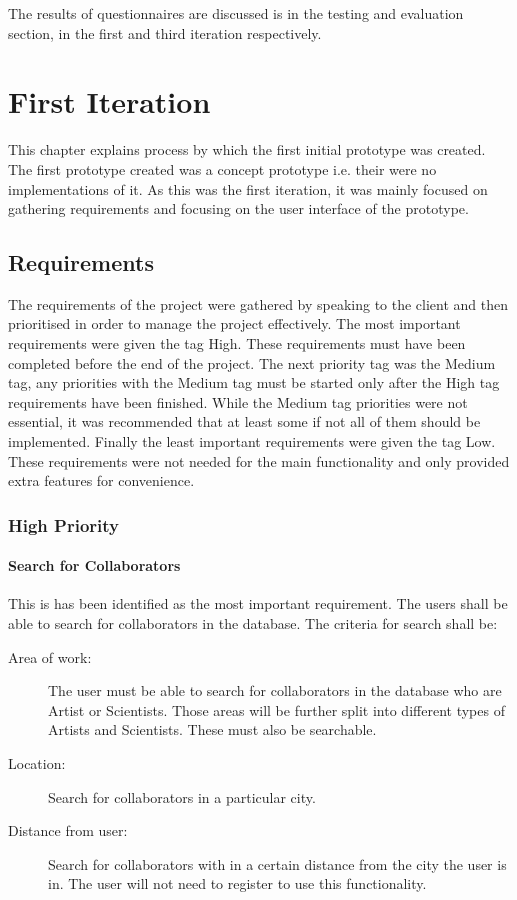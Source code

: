 \documentclass[a4paper,oneside,11pt]{report}
\begin{document}
The results of questionnaires are discussed is in the testing and evaluation section, in the first and third iteration respectively.
\chapter{First Iteration}
This chapter explains process by which the first initial prototype was created. The first prototype created was a concept prototype i.e. their were no implementations of it. As this was the first iteration, it was mainly focused on gathering requirements and focusing on the user interface of the prototype.

\section{Requirements}
The requirements of the project were gathered by speaking to the client and then prioritised in order to manage the project effectively. The most important requirements were given the tag High. These requirements must have been completed before the end of the project. The next priority tag was the Medium tag, any priorities with the Medium tag must be started only after the High tag requirements have been finished. While the Medium tag priorities were not essential, it was recommended that at least some if not all of them should be implemented. Finally the least important requirements were given the tag Low. These requirements were not needed for the main functionality and only provided extra features for convenience.

\subsection{High Priority}
\subsubsection{Search for Collaborators} 
This is has been identified as the most important requirement. The users shall be able to search for collaborators in the database. The criteria for search shall be:
\begin{description}
	\item[Area of work:] The user must be able to search for collaborators in the database who are Artist or Scientists. Those areas will be further split into different types of Artists and Scientists. These must also be searchable.
	\item[Location:] Search for collaborators in a particular city.
	\item[Distance from user:] Search for collaborators with in a certain distance from the city the user is in. The user will not need to register to use this functionality.
\end{description}
	
\end{document}
